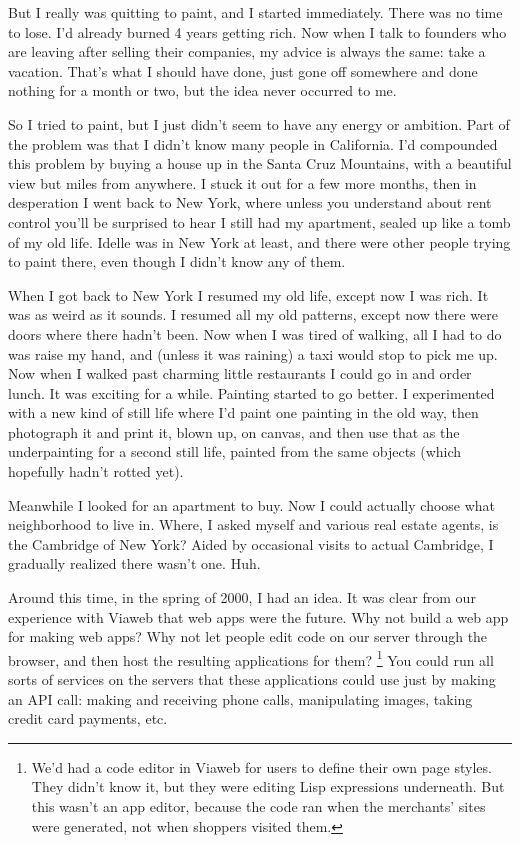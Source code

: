 \documentclass[12pt]{book}
\begin{document}
But I really was quitting to paint, and I started immediately. There was
no time to lose. I'd already burned 4 years getting rich. Now when I
talk to founders who are leaving after selling their companies, my
advice is always the same: take a vacation. That's what I should have
done, just gone off somewhere and done nothing for a month or two, but
the idea never occurred to me.

So I tried to paint, but I just didn't seem to have any energy or
ambition. Part of the problem was that I didn't know many people in
California. I'd compounded this problem by buying a house up in the
Santa Cruz Mountains, with a beautiful view but miles from anywhere. I
stuck it out for a few more months, then in desperation I went back to
New York, where unless you understand about rent control you'll be
surprised to hear I still had my apartment, sealed up like a tomb of my
old life. Idelle was in New York at least, and there were other people
trying to paint there, even though I didn't know any of them.

When I got back to New York I resumed my old life, except now I was
rich. It was as weird as it sounds. I resumed all my old patterns,
except now there were doors where there hadn't been. Now when I was
tired of walking, all I had to do was raise my hand, and (unless it was
raining) a taxi would stop to pick me up. Now when I walked past
charming little restaurants I could go in and order lunch. It was
exciting for a while. Painting started to go better. I experimented with
a new kind of still life where I'd paint one painting in the old way,
then photograph it and print it, blown up, on canvas, and then use that
as the underpainting for a second still life, painted from the same
objects (which hopefully hadn't rotted yet).

Meanwhile I looked for an apartment to buy. Now I could actually choose
what neighborhood to live in. Where, I asked myself and various real
estate agents, is the Cambridge of New York? Aided by occasional visits
to actual Cambridge, I gradually realized there wasn't one. Huh.

Around this time, in the spring of 2000, I had an idea. It was clear
from our experience with Viaweb that web apps were the future. Why not
build a web app for making web apps? Why not let people edit code on our
server through the browser, and then host the resulting applications for
them? \footnote{We'd had a code editor in Viaweb for users to define their own
page styles. They didn't know it, but they were editing Lisp expressions
underneath. But this wasn't an app editor, because the code ran when the
merchants' sites were generated, not when shoppers visited them.} You could run all sorts of services on the
servers that these applications could use just by making an API call:
making and receiving phone calls, manipulating images, taking credit
card payments, etc.
\end{document}
